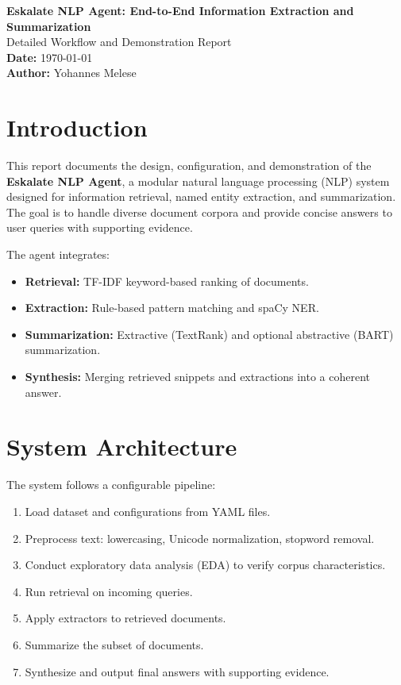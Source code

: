 \documentclass[12pt,a4paper]{article}
\begin{document}
\begin{center}
\vspace*{2cm}
{\LARGE \textbf{Eskalate NLP Agent: End-to-End Information Extraction and Summarization}}\\[0.5cm]
{\large Detailed Workflow and Demonstration Report}\\[2cm]
\textbf{Date:} \today\\[1cm]
\textbf{Author:} Yohannes Melese
\vfill
\end{center}
\newpage

\section{Introduction}
This report documents the design, configuration, and demonstration of the \textbf{Eskalate NLP Agent}, a modular natural language processing (NLP) system designed for information retrieval, named entity extraction, and summarization. The goal is to handle diverse document corpora and provide concise answers to user queries with supporting evidence.

The agent integrates:
\begin{itemize}[noitemsep]
  \item \textbf{Retrieval:} TF-IDF keyword-based ranking of documents.
  \item \textbf{Extraction:} Rule-based pattern matching and spaCy NER.
  \item \textbf{Summarization:} Extractive (TextRank) and optional abstractive (BART) summarization.
  \item \textbf{Synthesis:} Merging retrieved snippets and extractions into a coherent answer.
\end{itemize}

\section{System Architecture}
The system follows a configurable pipeline:
\begin{enumerate}[noitemsep]
  \item Load dataset and configurations from YAML files.
  \item Preprocess text: lowercasing, Unicode normalization, stopword removal.
  \item Conduct exploratory data analysis (EDA) to verify corpus characteristics.
  \item Run retrieval on incoming queries.
  \item Apply extractors to retrieved documents.
  \item Summarize the subset of documents.
  \item Synthesize and output final answers with supporting evidence.
\end{enumerate}
\end{document}
